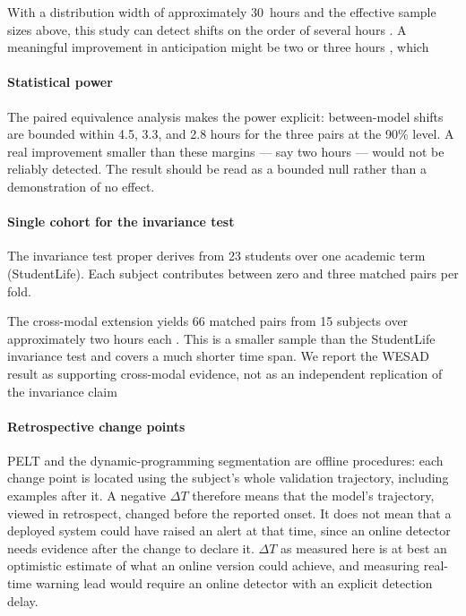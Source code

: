 \documentclass[preprint,12pt,authoryear]{elsarticle}
\newcommand{\dt}{$\Delta T$}
\providecommand{\DIFaddtex}[1]{{\protect\color{blue} \sf #1}} %
\providecommand{\DIFdeltex}[1]{{\protect\color{red} \scriptsize #1}} %
\providecommand{\DIFaddbegin}{} %
\providecommand{\DIFaddend}{} %
\providecommand{\DIFdelbegin}{} %
\providecommand{\DIFdelend}{} %
\providecommand{\DIFadd}[1]{\texorpdfstring{\DIFaddtex{#1}}{#1}} %
\providecommand{\DIFdel}[1]{\texorpdfstring{\DIFdeltex{#1}}{}} %
\newcommand{\DIFscaledelfig}{0.5}
\newlength{\DIFdelgraphicswidth} %
\newlength{\DIFdelgraphicsheight} %
\newcommand{\DIFaddincludegraphics}[2][]{{\color{blue}\fbox{\DIFOincludegraphics[#1]{#2}}}} %
\newcommand{\DIFdelincludegraphics}[2][]{%
\sbox{\DIFdelgraphicsbox}{\DIFOincludegraphics[#1]{#2}}%
\settoboxwidth{\DIFdelgraphicswidth}{\DIFdelgraphicsbox} %
\settoboxtotalheight{\DIFdelgraphicsheight}{\DIFdelgraphicsbox} %
\scalebox{\DIFscaledelfig}{%
\parbox[b]{\DIFdelgraphicswidth}{\usebox{\DIFdelgraphicsbox}\\[-\baselineskip] \rule{\DIFdelgraphicswidth}{0em}}\llap{\resizebox{\DIFdelgraphicswidth}{\DIFdelgraphicsheight}{%
\setlength{\unitlength}{\DIFdelgraphicswidth}%
\begin{picture}(1,1)%
\thicklines\linethickness{2pt} %
{\color[rgb]{1,0,0}\put(0,0){\framebox(1,1){}}}%
{\color[rgb]{1,0,0}\put(0,0){\line( 1,1){1}}}%
{\color[rgb]{1,0,0}\put(0,1){\line(1,-1){1}}}%
\end{picture}%
}\hspace*{3pt}}} %
} %
\DeclareRobustCommand{\DIFaddbegin}{\DIFOaddbegin \let\includegraphics\DIFaddincludegraphics} %
\DeclareRobustCommand{\DIFaddend}{\DIFOaddend \let\includegraphics\DIFOincludegraphics} %
\DeclareRobustCommand{\DIFdelbegin}{\DIFOdelbegin \let\includegraphics\DIFdelincludegraphics} %
\DeclareRobustCommand{\DIFdelend}{\DIFOaddend \let\includegraphics\DIFOincludegraphics} %
\begin{document}
\DIFdelbegin %
\DIFdel{With a distribution width of
approximately 30~hours and the effective sample sizes above, this study
can detect shifts on the order of several hours . A meaningful
improvement in anticipation might be two or three hours , which }\DIFdelend \DIFaddbegin \paragraph{Statistical power} \DIFadd{The paired equivalence analysis makes
the power explicit: between-model shifts are bounded within 4.5, 3.3,
and 2.8 hours for the three pairs at the 90\% level. A real
improvement smaller than these margins --- say two hours --- }\DIFaddend would not
be \DIFdelbegin \DIFdel{reliably }\DIFdelend detected. The result should be read as a bounded null rather than a
demonstration of no effect.

\DIFdelbegin %
\DIFdelend \DIFaddbegin \paragraph{Single cohort for the invariance test} \DIFaddend The invariance test
proper derives from 23 students over one academic term (StudentLife).
Each subject contributes between zero and three matched pairs per fold.

\DIFdelbegin %
\DIFdel{The cross-modal extension
yields 66 matched pairs from 15 subjects over approximately two hours
each . This is a smaller sample than the StudentLife invariance test and
covers a much shorter time span. We report the WESAD result as supporting
cross-modal evidence,
not as an independent replication of the invariance
claim}\DIFdelend \DIFaddbegin \paragraph{Retrospective change points} \DIFadd{PELT and the dynamic-programming
segmentation are offline procedures: each change point is located
using the subject's whole validation trajectory, including examples
after it. A negative \dt{} therefore means that the model's trajectory,
viewed in retrospect, changed before the reported onset. It does not
mean that a deployed system could have raised an alert at that time,
since an online detector needs evidence after the change to declare
it. \dt{} as measured here is at best an optimistic estimate of what
an online version could achieve, and measuring real-time warning lead would require an
online detector with an explicit detection delay}\DIFaddend .
\end{document}
